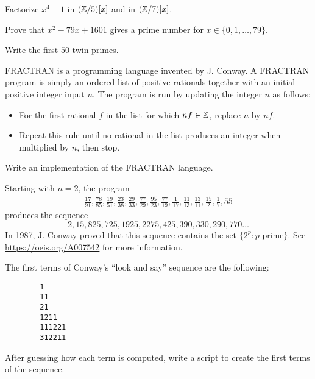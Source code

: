 \begin{prob}
	\label{prob:factors}
	Factorize $x^4-1$ in $(\mathbb{Z}/5)[x]$ and in $(\mathbb{Z}/7)[x]$.
\end{prob}

\begin{prob}
	\label{prob:primes}
	Prove that $x^2-79x+1601$ gives a prime number for
	$x\in\{0,1,\dots,79\}$.
\end{prob}

\begin{prob}
	\label{prob:twin}
	Write the first $50$ twin primes. 
\end{prob}

\begin{prob}
	\label{prob:fractran}
	FRACTRAN is a programming language invented by J. Conway. A FRACTRAN program
	is simply an ordered list of positive rationals together with an initial
	positive integer input $n$. The program is run by updating the integer $n$
	as follows:
	\begin{itemize}
		\item For the first rational $f$ in the list for which $nf\in\mathbb{Z}$,
			replace $n$ by $nf$.
		\item Repeat this rule until no rational in the list produces an
			integer when multiplied by $n$, then stop.
	\end{itemize}
	Write an implementation of the FRACTRAN language. 

	Starting with $n=2$, the program 
    \begin{align*}
                \frac{17}{91}, \frac{78}{85}, \frac{19}{51}, \frac{23}{38}, \frac{29}{33},
                \frac{77}{29}, \frac{95}{23}, \frac{77}{19}, \frac{1}{17}, \frac{11}{13}, \frac{13}{11}, \frac{15}{2}, \frac{1}{7}, 55
        \end{align*}
	produces the sequence 
	\[
	2, 15, 825, 725, 1925, 2275, 425, 390, 330, 290, 770\dots
	\]
	In 1987, J. Conway proved that this sequence contains the set
	$\{2^p:p\text{ prime}\}$.  See \url{https://oeis.org/A007542} for more
	information.
\end{prob}

\begin{prob}
	\label{prob:lookandsay}
	The first terms of Conway's ``look and say'' sequence are the following:
	\begin{lstlisting}
		1
		11
		21
		1211
		111221
		312211
	\end{lstlisting}
	After guessing how each term is computed, write a script to create the
	first terms of the sequence.
\end{prob}


